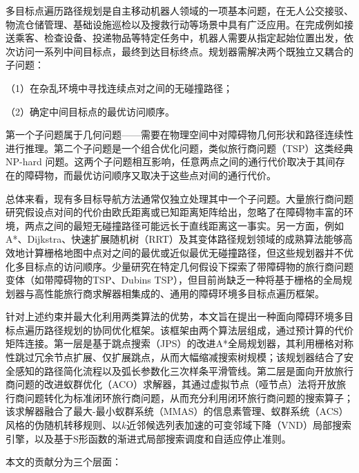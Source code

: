 \documentclass[lettersize,journal]{IEEEtran}
\begin{document}
多目标点遍历路径规划是自主移动机器人领域的一项基本问题，在无人公交接驳、物流仓储管理、基础设施巡检以及搜救行动等场景中具有广泛应用\textcolor{blue}{\cite{ref1,ref2}}。在完成例如接送乘客、检查设备、投递物品等特定任务中，机器人需要从指定起始位置出发，依次访问一系列中间目标点，最终到达目标终点。规划器需解决两个既独立又耦合的子问题：

（1）在杂乱环境中寻找连续点对之间的无碰撞路径；

（2）确定中间目标点的最优访问顺序。

第一个子问题属于几何问题——需要在物理空间中对障碍物几何形状和路径连续性进行推理。第二个子问题是一个组合优化问题，类似旅行商问题（TSP）这类经典 NP-hard 问题。这两个子问题相互影响，任意两点之间的通行代价取决于其间存在的障碍物，而最优访问顺序又取决于这些点对间的通行代价。

总体来看，现有多目标导航方法通常仅独立处理其中一个子问题。大量旅行商问题研究假设点对间的代价由欧氏距离或已知距离矩阵给出\textcolor{blue}{\cite{ref3,ref4}}，忽略了在障碍物丰富的环境，两点之间的最短无碰撞路径可能远长于直线距离这一事实。另一方面，例如A*、Dijkstra、快速扩展随机树（RRT）及其变体路径规划领域的成熟算法能够高效地计算栅格地图中点对之间的最优或近似最优无碰撞路径，但这些规划器并不优化多目标点的访问顺序\textcolor{blue}{\cite{ref5,ref6,ref7}}。少量研究在特定几何假设下探索了带障碍物的旅行商问题变体（如带障碍物的TSP、Dubins TSP），但目前尚缺乏一种将基于栅格的全局规划器与高性能旅行商求解器相集成的、通用的障碍环境多目标点遍历框架。

针对上述约束并最大化利用两类算法的优势，本文旨在提出一种面向障碍环境多目标点遍历路径规划的协同优化框架。该框架由两个算法层组成，通过预计算的代价矩阵连接。第一层是基于跳点搜索（JPS）的改进A*全局规划器，其利用栅格对称性跳过冗余节点扩展、仅扩展跳点，从而大幅缩减搜索树规模；该规划器结合了安全感知的路径简化流程以及弧长参数化三次样条平滑管线。第二层是面向开放旅行商问题的改进蚁群优化（ACO）求解器，其通过虚拟节点（哑节点）法将开放旅行商问题转化为标准闭环旅行商问题，从而充分利用闭环旅行商问题的搜索算子；该求解器融合了最大-最小蚁群系统（MMAS）的信息素管理、蚁群系统（ACS）风格的伪随机转移规则、以$k$近邻候选列表加速的可变邻域下降（VND）局部搜索引擎，以及基于S形函数的渐进式局部搜索调度和自适应停止准则。

本文的贡献分为三个层面：
\end{document}
